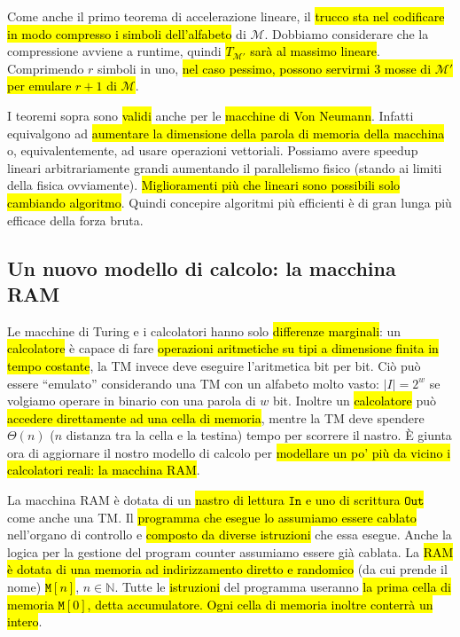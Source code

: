 \documentclass[a4paper,11pt,twoside]{article}
\theoremstyle{plain}
\theoremstyle{definition}
\theoremstyle{remark}
\begin{document}
Come anche il primo teorema di accelerazione lineare, il \hl{trucco sta nel
codificare in modo compresso i simboli dell'alfabeto} di $\mathcal{M}$. Dobbiamo
considerare che la compressione avviene a runtime, quindi \hl{$T_{\mathcal{M}'}$
sarà al massimo lineare}. Comprimendo $r$ simboli in uno, \hl{nel caso pessimo,
possono servirmi 3 mosse di $\mathcal{M}'$ per emulare $r+1$ di $\mathcal{M}$}.

I teoremi sopra sono \hl{validi} anche per le \hl{macchine di Von Neumann}.
Infatti equivalgono ad \hl{aumentare la dimensione della parola di memoria della
macchina} o, equivalentemente, ad usare operazioni vettoriali. Possiamo avere
speedup lineari arbitrariamente grandi aumentando il parallelismo fisico (stando
ai limiti della fisica ovviamente). \hl{Miglioramenti più che lineari sono
possibili solo cambiando algoritmo}. Quindi concepire algoritmi più efficienti è
di gran lunga più efficace della forza bruta.

\subsection{Un nuovo modello di calcolo: la macchina RAM}\label{sec:ram}

Le macchine di Turing e i calcolatori hanno solo \hl{differenze marginali}: un
\hl{calcolatore} è capace di fare \hl{operazioni aritmetiche su tipi a
dimensione finita in tempo costante}, la TM invece deve eseguire l'aritmetica
bit per bit. Ciò può essere ``emulato'' considerando una TM con un alfabeto
molto vasto: $|I| = 2^w$ se volgiamo operare in binario con una parola di $w$
bit. Inoltre un \hl{calcolatore} può \hl{accedere direttamente ad una cella di
memoria}, mentre la TM deve spendere $\Theta(n)$ ($n$ distanza tra la cella e la
testina) tempo per scorrere il nastro. È giunta ora di aggiornare il nostro
modello di calcolo per \hl{modellare un po' più da vicino i calcolatori reali:
la macchina RAM\@}.

La macchina RAM è dotata di un \hl{nastro di lettura $\mathtt{In}$ e uno di
scrittura $\mathtt{Out}$} come anche una TM\@. Il \hl{programma che esegue lo
assumiamo essere cablato} nell'organo di controllo e \hl{composto da diverse
istruzioni} che essa esegue. Anche la logica per la gestione del program counter
assumiamo essere già cablata. La \hl{RAM è dotata di una memoria ad
indirizzamento diretto e randomico} (da cui prende il nome)
\hl{$\mathtt{M}[n]$}, $n\in\mathbb{N}$. Tutte le \hl{istruzioni} del programma
useranno \hl{la prima cella di memoria $\mathtt{M}[0]$, detta accumulatore. Ogni
cella di memoria inoltre conterrà un intero}.
\end{document}
